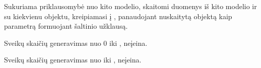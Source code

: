 \documentclass[letterpaper,10pt,lithuanian]{sphinxmanual}
\begin{document}
\begin{fulllineitems}
\label{\detokenize{dimensijos:param.prepare.read}}
\pysigstartsignatures
{}
\pysigstopsignatures
\sphinxAtStartPar
Sukuriama priklausomybė nuo kito modelio, skaitomi duomenys iš kito modelio
ir su kiekvienu objektu, kreipiamasi į {\hyperref[\detokenize{dimensijos:resource.source}]{}}, panaudojant
nuskaitytą objektą kaip parametrą formuojant šaltinio užklausą.

\end{fulllineitems}


\begin{fulllineitems}
\label{\detokenize{dimensijos:param.prepare.range}}
\pysigstartsignatures
{}
\pysigstopsignatures
\sphinxAtStartPar
Sveikų skaičių generavimas nuo 0 iki ,  neįeina.

\end{fulllineitems}



\begin{fulllineitems}

\pysigstartsignatures
{}
\pysigstopsignatures
\sphinxAtStartPar
Sveikų skaičių generavimas nuo  iki ,  neįeina.

\end{fulllineitems}

\end{document}
